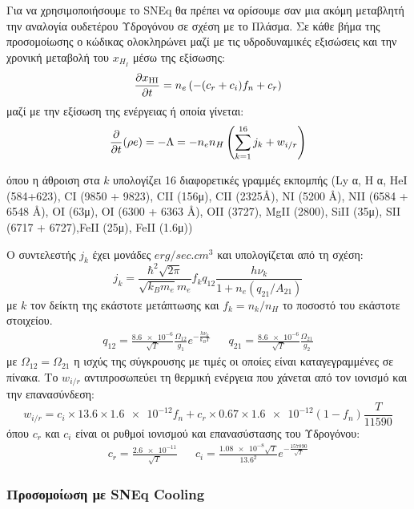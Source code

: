 	Για να χρησιμοποιήσουμε το SNEq θα πρέπει να ορίσουμε σαν μια ακόμη μεταβλητή την
	αναλογία ουδετέρου Υδρογόνου σε σχέση με το Πλάσμα.
	Σε κάθε βήμα της προσομοίωσης ο κώδικας ολοκληρώνει μαζί με τις υδροδυναμικές εξισώσεις και την χρονική μεταβολή του $x_{H_I}$ μέσω της εξίσωσης:
	\begin{equation}
	\pdv{x_{\ce{HI}}}{t}=n_e \left( -(c_r+c_i)f_n+c_r\right) 
	\end{equation}
	μαζί με την εξίσωση της ενέργειας ή οποία γίνεται:
	\begin{equation}
	\pdv{t}(\rho e)=-\Lambda=-n_e n_H \left( \sum\limits_{k=1}^{16}j_k +w_{i/r} \right) 
	\end{equation}
	
	όπου η άθροιση στα $k$ υπολογίζει 16 διαφορετικές γραμμές εκπομπής 
	(Ly α, H α, HeI (584+623), CI (9850 + 9823), CII (156μ), CII (2325Å), NI (5200 Å),
	NII (6584 + 6548 Å), OI (63μ), OI (6300 + 6363 Å), OII (3727), MgII (2800), SiII (35μ), SII (6717 + 6727),FeII (25μ), FeII (1.6μ))
	
	Ο συντελεστής $j_k$ έχει μονάδες $\si{erg/sec . cm^3}$ και υπολογίζεται από τη σχέση:
	\begin{equation}
	j_k=\frac{\hbar^2 \sqrt{2\pi}}{\sqrt{k_B m_e}m_e}f_k q_{12}\frac{h \nu _k}{1+n_e (q_{21}/A_{21})}
	\end{equation}
	με $k$ τον δείκτη της εκάστοτε μετάπτωσης και $f_k=n_k/n_H$ το ποσοστό του εκάστοτε στοιχείου.
	\begin{align}
	q_{12}=\frac{\num{8.6e-6}}{\sqrt{T}}\frac{\Omega _{12}}{g_1}e^{-\frac{h\nu _k}{k_B T}} 
	&&
	q_{21}=\frac{\num{8.6e-6}}{\sqrt{T}}\frac{\Omega _{21}}{g_2}
	\end{align} 
	με $\Omega _{12} = \Omega _{21}$ η ισχύς της σύγκρουσης με τιμές οι οποίες είναι καταγεγραμμένες σε πίνακα.
	Το $w_{i/r}$ αντιπροσωπεύει τη θερμική ενέργεια που χάνεται από τον ιονισμό και την επανασύνδεση:
	\begin{equation}
	w_{i/r} = c_i\times \num{13.6}\times \num{1.6e-12} f_n +c_r \times \num{0.67}\times \num{1.6e-12} (1-f_n) \frac{T}{11590}
	\end{equation}
	όπου $c_r$ και $c_i$ είναι οι ρυθμοί ιονισμού και επανασύστασης του Υδρογόνου:
	\begin{align}
	c_r=\frac{\num{2.6e-11}}{\sqrt{T}} 
	&& 
	c_i=\frac{\num{1.08e-8}\sqrt{T}}{\num{13.6}^2} e^{-\frac{\num{157890}}{\sqrt{T}}}
	\end{align}
	
	
	\subsubsection{Προσομοίωση με SNEq Cooling}
	
